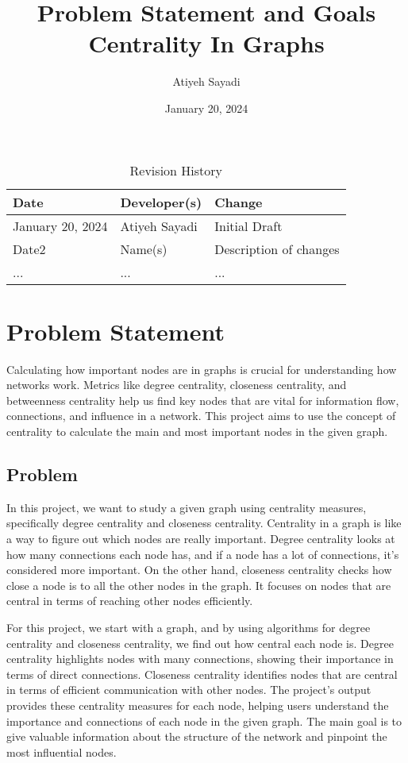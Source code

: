 \documentclass{article}
\title{Problem Statement and Goals\\Centrality In Graphs}
\author{Atiyeh Sayadi}
\date{January 20, 2024}
\begin{document}
\maketitle

\begin{table}[hp]
\caption{Revision History} \label{TblRevisionHistory}
\begin{tabularx}{\textwidth}{llX}
\toprule
\textbf{Date} & \textbf{Developer(s)} & \textbf{Change}\\
\midrule
January 20, 2024 & Atiyeh Sayadi & Initial Draft\\
Date2 & Name(s) & Description of changes\\
... & ... & ...\\
\bottomrule
\end{tabularx}
\end{table}

\section{Problem Statement}

Calculating how important nodes are in graphs is crucial for understanding how networks work. Metrics like degree centrality, closeness centrality, and betweenness centrality help us find key nodes that are vital for information flow, connections, and influence in a network. This project aims to use the concept of centrality to calculate the main and most important nodes in the given graph.

\subsection{Problem}

In this project, we want to study a given graph using centrality measures, specifically degree centrality and closeness centrality. Centrality in a graph is like a way to figure out which nodes are really important. Degree centrality looks at how many connections each node has, and if a node has a lot of connections, it's considered more important. On the other hand, closeness centrality checks how close a node is to all the other nodes in the graph. It focuses on nodes that are central in terms of reaching other nodes efficiently.

For this project, we start with a graph, and by using algorithms for degree centrality and closeness centrality, we find out how central each node is. Degree centrality highlights nodes with many connections, showing their importance in terms of direct connections. Closeness centrality identifies nodes that are central in terms of efficient communication with other nodes. The project's output provides these centrality measures for each node, helping users understand the importance and connections of each node in the given graph. The main goal is to give valuable information about the structure of the network and pinpoint the most influential nodes.
\end{document}
